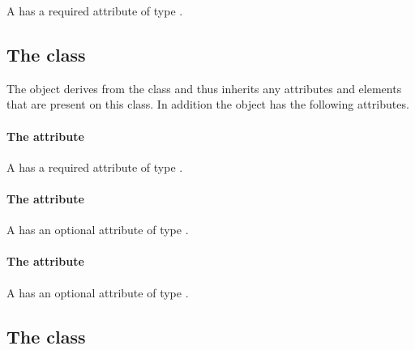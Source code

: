 A \CSGRotation has a required attribute  of
type .


\subsection{The  class}
\label{csgscale-class}




The \CSGScale object derives from the \CSGTransformation class and thus
inherits any attributes and elements that are present on this class.
In addition the \CSGScale object has the following attributes.

\paragraph{The \fixttspace{} attribute}

A \CSGScale has a required attribute  of type
.


\paragraph{The \fixttspace{} attribute}

A \CSGScale has an optional attribute  of type
.


\paragraph{The \fixttspace{} attribute}

A \CSGScale has an optional attribute  of type
.


\subsection{The  class}
\label{csghomogeneoustransformation-class}

